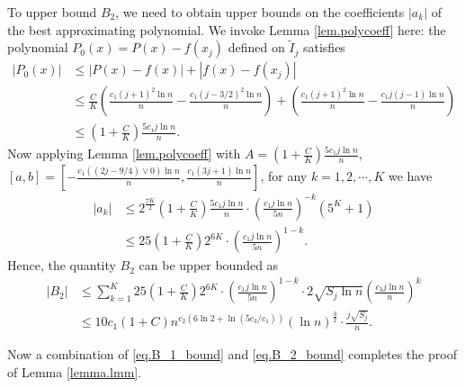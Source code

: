 \documentclass[final,12pt]{colt2018} %
\begin{document}
To upper bound $B_2$, we need to obtain upper bounds on the coefficients $|a_k|$ of the best approximating polynomial. We invoke Lemma \ref{lem.polycoeff} here: the polynomial $P_0(x)=P(x)-f(x_j)$ defined on $\tilde{I}_j$ satisfies
\begin{align*}
|P_0(x)| &\le |P(x)-f(x)| + |f(x)-f(x_j)| \\
&\le \frac{C}{K}\left(\frac{c_1(j+1)^2\ln n}{n}-\frac{c_1(j-3/2)^2\ln n}{n}\right) + \left(\frac{c_1(j+1)^2\ln n}{n} - \frac{c_1j(j-1)\ln n}{n}\right) \\
&\le \left(1+\frac{C}{K}\right)\frac{5c_1j\ln n}{n}.
\end{align*}
Now applying Lemma \ref{lem.polycoeff} with $A=\left(1+\frac{C}{K}\right)\frac{5c_1j\ln n}{n}$, $[a,b]=[-\frac{c_1((2j-9/4)\vee 0)\ln n}{n},\frac{c_1(3j+1)\ln n}{n}]$, for any $k=1,2,\cdots,K$ we have
\begin{align*}
|a_k| &\le 2^{\frac{7K}{2}}\left(1+\frac{C}{K}\right)\frac{5c_1j\ln n}{n}\cdot \left(\frac{c_1j\ln n}{5n}\right)^{-k}(5^K+1) \\
&\le 25\left(1+\frac{C}{K}\right)2^{6K}\cdot \left(\frac{c_1j\ln n}{5n}\right)^{1-k}.
\end{align*}
Hence, the quantity $B_2$ can be upper bounded as
\begin{align}
|B_2| &\le \sum_{k=1}^K 25\left(1+\frac{C}{K}\right)2^{6K}\cdot \left(\frac{c_1j\ln n}{5n}\right)^{1-k}\cdot 2\sqrt{S_j\ln n}\left(\frac{c_3j\ln n}{n}\right)^k \nonumber\\
&\le 10c_1(1+C)n^{c_2(6\ln 2+\ln(5c_3/c_1))}(\ln n)^{\frac{3}{2}}\cdot \frac{j\sqrt{S_j}}{n}. \label{eq.B_2_bound}
\end{align}

Now a combination of \eqref{eq.B_1_bound} and \eqref{eq.B_2_bound} completes the proof of Lemma \ref{lemma.lmm}.
\end{document}
